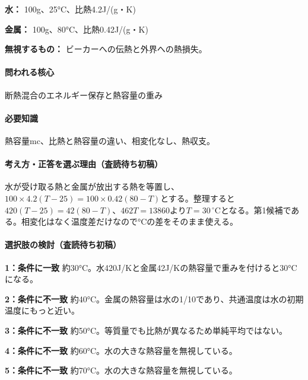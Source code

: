 \noindent\textbf{水：} 100g、25°C、比熱4.2J/(g・K)\par

\noindent\textbf{金属：} 100g、80°C、比熱0.42J/(g・K)\par

\noindent\textbf{無視するもの：} ビーカーへの伝熱と外界への熱損失。\par

\paragraph{問われる核心} 断熱混合のエネルギー保存と熱容量の重み

\paragraph{必要知識} 熱容量mc、比熱と熱容量の違い、相変化なし、熱収支。

\paragraph{考え方・正答を選ぶ理由（査読待ち初稿）} 水が受け取る熱と金属が放出する熱を等置し、\(100\times4.2(T-25)=100\times0.42(80-T)\)とする。整理すると\(420(T-25)=42(80-T)\)、\(462T=13860\)より\(T=30\,{}^\circ\mathrm{C}\)となる。第1候補である。相変化はなく温度差だけなので°Cの差をそのまま使える。

\paragraph{選択肢の検討（査読待ち初稿）}\mbox{}\par

\noindent\textbf{1：条件に一致} 約30°C。水420J/Kと金属42J/Kの熱容量で重みを付けると30°Cになる。\par

\noindent\textbf{2：条件に不一致} 約40°C。金属の熱容量は水の1/10であり、共通温度は水の初期温度にもっと近い。\par

\noindent\textbf{3：条件に不一致} 約50°C。等質量でも比熱が異なるため単純平均ではない。\par

\noindent\textbf{4：条件に不一致} 約60°C。水の大きな熱容量を無視している。\par

\noindent\textbf{5：条件に不一致} 約70°C。水の大きな熱容量を無視している。\par

